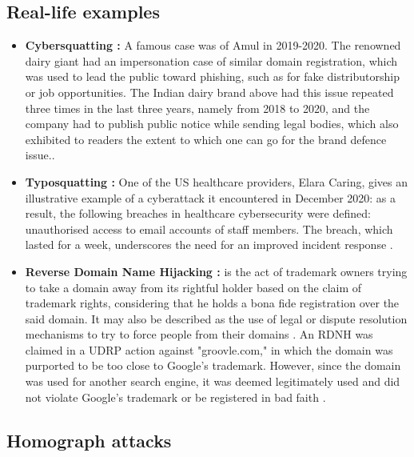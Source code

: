 \subsection{Real-life examples}

\begin{itemize}
    \item \textbf{Cybersquatting :} A famous case was of Amul in 2019-2020. The renowned dairy giant had an impersonation case of similar domain registration, which was used to lead the public toward phishing, such as for fake distributorship or job opportunities. The Indian dairy brand above had this issue repeated three times in the last three years, namely from 2018 to 2020, and the company had to publish public notice while sending legal bodies, which also exhibited to readers the extent to which one can go for the brand defence issue.\cite{MehtaCybersquatting}.
    
    \item \textbf{Typosquatting :} One of the US healthcare providers, Elara Caring, gives an illustrative example of a cyberattack it encountered in December 2020: as a result, the following breaches in healthcare cybersecurity were defined: unauthorised access to email accounts of staff members. The breach, which lasted for a week, underscores the need for an improved incident response \cite{PandaSecurityPhishing}.
    
     \item \textbf{Reverse Domain Name Hijacking  :} is the act of trademark owners trying to take a domain away from its rightful holder based on the claim of trademark rights, considering that he holds a bona fide registration over the said domain. It may also be described as the use of legal or dispute resolution mechanisms to try to force people from their domains \cite{Sun2006DomainTrademarkConflict}.  An RDNH was claimed in a UDRP action against "groovle.com," in which the domain was purported to be too close to Google's trademark. However, since the domain was used for another search engine, it was deemed legitimately used and did not violate Google's trademark or be registered in bad faith \cite{Singh2011ReverseDomainHijacking}.
\end{itemize}


\subsection {Homograph attacks} 


